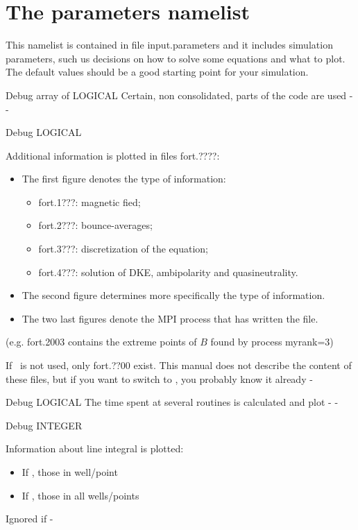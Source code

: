 \section{The {\ttfamily parameters} namelist}\label{SEC_PARAM}

This namelist is contained in file {\ttfamily input.parameters} and it includes simulation parameters, such us decisions on how to solve some equations and what to plot. The default values should be a good starting point for your simulation.

{Debug}
{array of LOGICAL}
{Certain, non consolidated, parts of the code are used}
{\false}
{-}
{-}

{Debug}
{LOGICAL}
{Additional information is plotted in files {\ttfamily fort.????}:\begin{itemize}
\item The first figure denotes the type of information:\begin{itemize}
\item {\ttfamily fort.1???}: magnetic fied;
\item {\ttfamily fort.2???}: bounce-averages;
\item {\ttfamily fort.3???}: discretization of the equation;
\item {\ttfamily fort.4???}: solution of DKE, ambipolarity and quasineutrality.\end{itemize}
\item The second figure determines more specifically the type of information.
\item The two last figures denote the {\ttfamily MPI} process that has written the file.
\end{itemize}
(e.g. {\ttfamily fort.2003} contains the extreme points of $B$ found by process {\ttfamily myrank=3})}
{\false}
{If \MPI~is not used, only {\ttfamily fort.??00} exist. This manual does not describe the content of these files, but if you want to switch  to \true, you probably know it already}
{-}

{Debug}
{LOGICAL}
{The time spent at several routines is calculated and plot}
{\true}
{-}
{-}

{Debug}
{INTEGER}
{Information about line integral is plotted:\begin{itemize}
\item If , those in well/point 
\item If , those in all wells/points
\end{itemize}}
{\false}
{Ignored if \notf{}}
{-}

